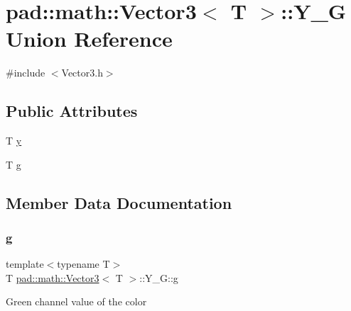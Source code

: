 \hypertarget{unionpad_1_1math_1_1_vector3_1_1_y___g}{}\section{pad\+:\+:math\+:\+:Vector3$<$ T $>$\+:\+:Y\+\_\+G Union Reference}
\label{unionpad_1_1math_1_1_vector3_1_1_y___g}


{\ttfamily \#include $<$Vector3.\+h$>$}

\subsection*{Public Attributes}
\begin{DoxyCompactItemize}
\item 
T \mbox{\hyperlink{unionpad_1_1math_1_1_vector3_1_1_y___g_a6de4dc5fea0530d03c80266acbfe154b}{y}}
\item 
T \mbox{\hyperlink{unionpad_1_1math_1_1_vector3_1_1_y___g_a7b57bf9118bc636dee89a6bd88283a78}{g}}
\end{DoxyCompactItemize}


\subsection{Member Data Documentation}
\mbox{\label{unionpad_1_1math_1_1_vector3_1_1_y___g_a7b57bf9118bc636dee89a6bd88283a78}} 
\subsubsection{\texorpdfstring{g}{g}}
{\footnotesize\ttfamily template$<$typename T$>$ \\
T \mbox{\hyperlink{structpad_1_1math_1_1_vector3}{pad\+::math\+::\+Vector3}}$<$ T $>$\+::Y\+\_\+\+G\+::g}

Green channel value of the color \mbox{\label{unionpad_1_1math_1_1_vector3_1_1_y___g_a6de4dc5fea0530d03c80266acbfe154b}} 
